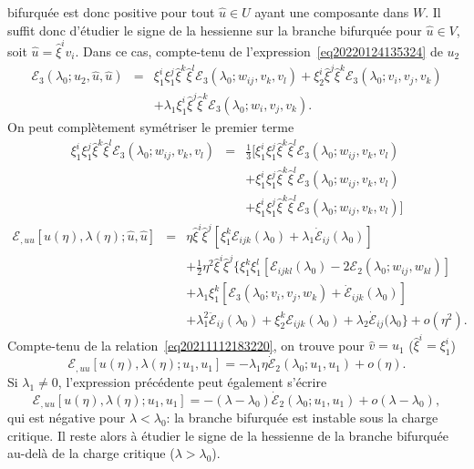 \documentclass[12pt, final]{amsart}
\begin{document}
bifurquée est donc positive pour tout $\hat{u} \in U$ ayant une composante
dans $W$. Il suffit donc d'étudier le signe de la hessienne sur la branche
bifurquée pour $\hat{u} \in V$, soit $\hat{u} = \hat{\xi}^i v_i$. Dans ce
cas, compte-tenu de l'expression~\eqref{eq20220124135324} de $u_2$
\begin{eqnarray}
  \mathcal{E}_3 (\lambda_0 ; u_2, \hat{u}, \hat{u}) & = & \xi_1^i \xi_1^j
  \hat{\xi}^k  \hat{\xi}^l \mathcal{E}_3 (\lambda_0 ; w_{i  j}, v_k,
  v_l) + \xi_2^i  \hat{\xi}^j  \hat{\xi}^k \mathcal{E}_3 (\lambda_0 ; v_i,
  v_j, v_k) \nonumber\\
  &  & + \lambda_1 \xi_1^i  \hat{\xi}^j  \hat{\xi}^k \mathcal{E}_3 (\lambda_0
  ; w_i, v_j, v_k) .
\end{eqnarray}
On peut complètement symétriser le premier terme
\begin{eqnarray}
  \xi_1^i \xi_1^j  \hat{\xi}^k  \hat{\xi}^l \mathcal{E}_3 (\lambda_0 ; w_{i
   j}, v_k, v_l) & = & \tfrac{1}{3} [\xi_1^i \xi_1^j  \hat{\xi}^k
  \hat{\xi}^l \mathcal{E}_3 (\lambda_0 ; w_{i  j}, v_k, v_l)
   \nonumber\\
  &  & + \xi_1^i \xi_1^j  \hat{\xi}^k  \hat{\xi}^l \mathcal{E}_3 (\lambda_0 ;
  w_{i  j}, v_k, v_l) \nonumber\\
  &  &  + \xi_1^i \xi_1^j  \hat{\xi}^k  \hat{\xi}^l \mathcal{E}_3
  (\lambda_0 ; w_{i  j}, v_k, v_l)]
\end{eqnarray}
\begin{eqnarray}
  \mathcal{E}_{, u  u} [u (\eta), \lambda (\eta) ; \hat{u}, \hat{u}] &
  = & \eta \hat{\xi}^i  \hat{\xi}^j  [\xi_1^k \mathcal{E}_{i  j
   k} (\lambda_0) + \lambda_1  \dot{\mathcal{E}}_{i  j}
  (\lambda_0)] \nonumber\\
  &  & + \tfrac{1}{2} \eta^2 \hat{\xi}^i
  \hat{\xi}^j  \{ \xi_1^k \xi_1^l  [\mathcal{E}_{i  j  k
   l} (\lambda_0) - 2\mathcal{E}_2 (\lambda_0 ; w_{i  j}, w_{k
   l})]  \nonumber\\
  &  & + \lambda_1 \xi_1^k  [\mathcal{E}_3 (\lambda_0 ; v_i, v_j, w_k) +
  \dot{\mathcal{E}}_{i  j  k} (\lambda_0)] \nonumber\\
  &  & + \lambda_1^2  \ddot{\mathcal{E}}_{i  j} (\lambda_0) + \xi_2^k
  \mathcal{E}_{i  j  k} (\lambda_0) + \lambda_2
  \dot{\mathcal{E}}_{i  j} (\lambda_0 \} + o (\eta^2) .
  \label{eq20220203144500}
\end{eqnarray}
Compte-tenu de la relation~\eqref{eq20211112183220}, on trouve pour $\hat{v} =
u_1$ ($\hat{\xi}^i = \xi_1^i$)
\begin{equation}
  \mathcal{E}_{, u  u} [u (\eta), \lambda (\eta) ; u_1, u_1] = -
  \lambda_1 \eta \dot{\mathcal{E}}_2 (\lambda_0 ; u_1, u_1) + o (\eta) .
\end{equation}
Si $\lambda_1 \neq 0$, l'expression précédente peut également
s'écrire
\begin{equation}
  \mathcal{E}_{, u  u} [u (\eta), \lambda (\eta) ; u_1, u_1] = -
  (\lambda - \lambda_0)  \dot{\mathcal{E}}_2 (\lambda_0 ; u_1, u_1) + o
  (\lambda - \lambda_0),
\end{equation}
qui est négative pour $\lambda < \lambda_0$: la branche bifurquée est
instable sous la charge critique. Il reste alors à étudier le signe de
la hessienne de la branche bifurquée au-delà de la charge critique
($\lambda > \lambda_0$).
\end{document}
